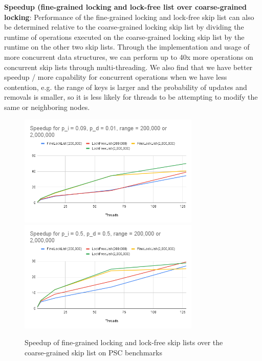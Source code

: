 \documentclass[11pt]{article}
\begin{document}
\textbf{Speedup (fine-grained locking and lock-free list over coarse-grained locking}: Performance of the fine-grained locking and lock-free skip list can also be determined relative to the coarse-grained locking skip list by dividing the runtime of operations executed on the coarse-grained locking skip list by the runtime on the other two skip lists. Through the implementation and usage of more concurrent data structures, we can perform up to 40x more operations on concurrent skip lists through multi-threading. We also find that we have better speedup / more capability for concurrent operations when we have less contention, e.g. the range of keys is larger and the probability of updates and removals is smaller, so it is less likely for threads to be attempting to modify the same or neighboring nodes. 
\begin{figure}[ht]
  \includegraphics[width=3.4in]{Speedup for p_i = 0.09, p_d = 0.01, range = 200,000 or 2,000,000.png}
  \includegraphics[width=3.4in]{Speedup for p_i = 0.5, p_d = 0.5, range = 200,000 or 2,000,000.png}
  \caption{Speedup of fine-grained locking and lock-free skip lists over the coarse-grained skip list on PSC benchmarks}
\end{figure}

\pagebreak
\end{document}
